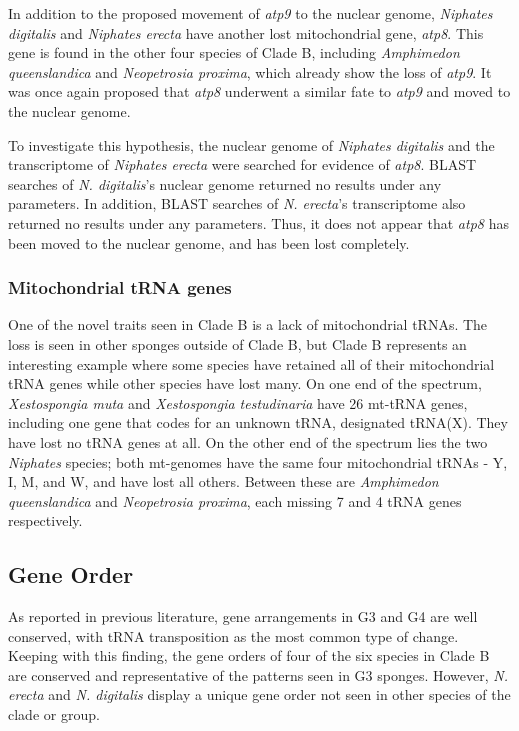 \documentclass[../main.tex]{subfiles}
\begin{document}
In addition to the proposed movement of \emph{atp9} to the nuclear genome, \emph{Niphates digitalis} and \emph{Niphates erecta} have another lost mitochondrial gene, \emph{atp8}. This gene is found in the other four species of Clade B, including \emph{Amphimedon queenslandica} and \emph{Neopetrosia proxima}, which already show the loss of \emph{atp9}. It was once again proposed that \emph{atp8} underwent a similar fate to \emph{atp9} and moved to the nuclear genome. 

To investigate this hypothesis, the nuclear genome of \emph{Niphates digitalis} and the transcriptome of \emph{Niphates erecta} were searched for evidence of \emph{atp8}. BLAST searches of \emph{N. digitalis}'s nuclear genome returned no results under any parameters. In addition, BLAST searches of \emph{N. erecta}'s transcriptome also returned no results under any parameters. Thus, it does not appear that \emph{atp8} has been moved to the nuclear genome, and has been lost completely.

\subsubsection{Mitochondrial tRNA genes}
One of the novel traits seen in Clade B is a lack of mitochondrial tRNAs. The loss is seen in other sponges outside of Clade B, but Clade B represents an interesting example where some species have retained all of their mitochondrial tRNA genes while other species have lost many. On one end of the spectrum, \emph{Xestospongia muta} and \emph{Xestospongia testudinaria} have 26 mt-tRNA genes, including one gene that codes for an unknown tRNA, designated tRNA(X). They have lost no tRNA genes at all. On the other end of the spectrum lies the two \emph{Niphates} species; both mt-genomes have the same four mitochondrial tRNAs - Y, I, M, and W, and have lost all others. Between these are \emph{Amphimedon queenslandica} and \emph{Neopetrosia proxima}, each missing 7 and 4 tRNA genes respectively.

\subsection{Gene Order}

As reported in previous literature, gene arrangements in  G3 and G4 are well conserved, with tRNA transposition as the most common type of change. Keeping with this finding, the gene orders of four of the six species in Clade B are conserved and representative of the patterns seen in G3 sponges. However, \emph{N. erecta} and \emph{N. digitalis} display a unique gene order not seen in other species of the clade or group.
\end{document}
